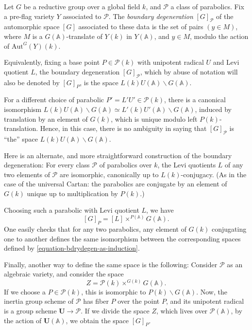 \begin{definition}
 \label{definition-boundary-degeneration}
Let $G$ be a reductive group over a global field $k$, and $\mathcal P$ a class of parabolics. Fix a pre-flag variety $Y$ associated to $\mathcal P$.
The {\it boundary degeneration} $[G]_{\mathcal P}$ of the automorphic space $[G]$ associated to these data is the set of pairs $(y \in M)$, where $M$ is a $G(\mathbb A)$-translate of $Y(k)$ in $Y(\mathbb A)$, and $y\in M$,  modulo the action of $\text{Aut}^G(Y)(k)$. 

Equivalently, fixing a base point $P\in \mathcal P(k)$ with unipotent radical $U$ and Levi quotient $L$, the boundary degeneration $[G]_{\mathcal P}$, which by abuse of notation will also be denoted by $[G]_P$, is the space $L(k)U(\mathbb A)\backslash G(\mathbb A)$.
\end{definition}

\begin{remark}
 \label{remark-boundary-degeneration}
For a different choice of parabolic $P'= L' U'\in \mathcal P(k)$, there is a canonical isomorphism $ L(k)U(\mathbb A)\backslash G(\mathbb A) \simeq L'(k)U'(\mathbb A)\backslash G(\mathbb A)$, induced by translation by an element of $G(k)$, which is unique modulo left $P(k)$-translation. Hence, in this case, there is no ambiguity in saying that $[G]_{\mathcal P}$ is ``the'' space $L(k)U(\mathbb A)\backslash G(\mathbb A)$.
\end{remark}

\begin{remark}
 \label{remark-bdrydegen-as-induction}
Here is an alternate, and more straightforward construction of the boundary degeneration: For every class $\mathcal P$ of parabolics over $k$, the Levi quotients $L$ of any two elements of $\mathcal P$ are isomorphic, canonically up to $L(k)$-conjugacy. (As in the case of the universal Cartan: the parabolics are conjugate by an element of $G(k)$ unique up to multiplication by $P(k)$.)

Choosing such a parabolic with Levi quotient $L$, we have 
\begin{equation}
 \label{equation-bdrydegen-as-induction}
[G]_P = [L]\times^{P(\mathbb A)} G(\mathbb A).
\end{equation}
One easily checks that for any two parabolics, any element of $G(k)$ conjugating one to another defines the same isomorphism between the corresponding spaces defined by \eqref{equation-bdrydegen-as-induction}.

Finally, another way to define the same space is the following: Consider $\mathcal P$ as an algebraic variety, and consider the space
$$ Z= \mathcal P(k)\times^{G(k)} G(\mathbb A).$$
If we choose a $P\in \mathcal P(k)$, this is isomorphic to $P(k)\backslash G(\mathbb A)$. Now, the inertia group scheme of $\mathcal P$ has fiber $P$ over the point $P$, and its unipotent radical is a group scheme $\mathbf U\to \mathcal P$. If we divide the space $Z$, which lives over $\mathcal P(\mathbb A)$, by the action of $\mathbf U(\mathbb A)$, we obtain the space $[G]_P$.
\end{remark}


